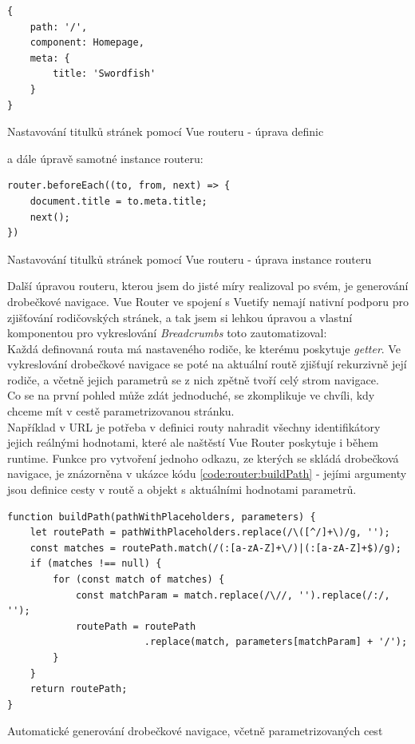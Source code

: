 \begin{listing}[H]
\begin{verbatim}
{
    path: '/',
    component: Homepage,
    meta: {
        title: 'Swordfish'
    }
}
\end{verbatim}
\caption{Nastavování titulků stránek pomocí Vue routeru - úprava definic} \label{code:vue-router-title1}
\end{listing}

a dále úpravě samotné instance routeru:

\begin{listing}[H]
    \begin{verbatim}
router.beforeEach((to, from, next) => {
    document.title = to.meta.title;
    next();
})
\end{verbatim}
\caption{Nastavování titulků stránek pomocí Vue routeru - úprava instance routeru} \label{code:vue-router-title2}
\end{listing}

Další úpravou routeru, kterou jsem do jisté míry realizoval po svém, je generování drobečkové navigace. Vue Router ve spojení s Vuetify nemají nativní podporu pro zjišťování rodičovských stránek, a tak jsem si lehkou úpravou a vlastní komponentou pro vykreslování \emph{Breadcrumbs} toto zautomatizoval:\\
Každá definovaná routa má nastaveného rodiče, ke kterému poskytuje \emph{getter}. Ve vykreslování drobečkové navigace se poté na aktuální routě zjišťují rekurzivně její rodiče, a včetně jejich parametrů se z nich zpětně tvoří celý strom navigace.\\
Co se na první pohled může zdát jednoduché, se zkomplikuje ve chvíli, kdy chceme mít v cestě parametrizovanou stránku.\\
Například v URL  je potřeba v definici routy nahradit všechny identifikátory jejich reálnými hodnotami, které ale naštěstí Vue Router poskytuje i během runtime. Funkce pro vytvoření jednoho odkazu, ze kterých se skládá drobečková navigace, je znázorněna v ukázce kódu \ref{code:router:buildPath} - jejími argumenty jsou definice cesty v routě a objekt s aktuálními hodnotami parametrů.

\begin{listing}[H]
    \begin{verbatim}
function buildPath(pathWithPlaceholders, parameters) {
    let routePath = pathWithPlaceholders.replace(/\([^/]+\)/g, '');
    const matches = routePath.match(/(:[a-zA-Z]+\/)|(:[a-zA-Z]+$)/g);
    if (matches !== null) {
        for (const match of matches) {
            const matchParam = match.replace(/\//, '').replace(/:/, '');
            routePath = routePath
                        .replace(match, parameters[matchParam] + '/');
        }
    }
    return routePath;
}
\end{verbatim}
\caption{Automatické generování drobečkové navigace, včetně parametrizovaných cest} \label{code:router:buildPath}
\end{listing}

